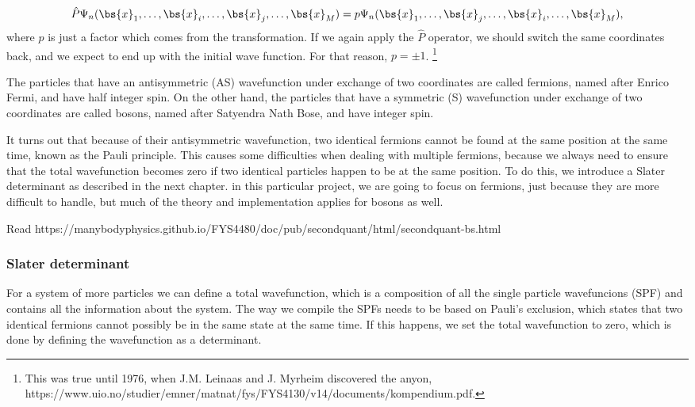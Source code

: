 \begin{equation}
\hat{P}\Psi_n(\bs{x}_1,\hdots,\bs{x}_i,\hdots,\bs{x}_j,\hdots,\bs{x}_M)=p\Psi_n(\bs{x}_1,\hdots,\bs{x}_j,\hdots,\bs{x}_i,\hdots,\bs{x}_M),
\end{equation}
where $p$ is just a factor which comes from the transformation. If we again apply the $\hat{P}$ operator, we should switch the same coordinates back, and we expect to end up with the initial wave function. For that reason, $p=\pm1$. \footnote{This was true until 1976, when J.M. Leinaas and J. Myrheim discovered the anyon, https://www.uio.no/studier/emner/matnat/fys/FYS4130/v14/documents/kompendium.pdf.}

The particles that have an antisymmetric (AS) wavefunction under exchange of two coordinates are called fermions, named after Enrico Fermi, and have half integer spin. On the other hand, the particles that have a symmetric (S) wavefunction under exchange of two coordinates are called bosons, named after Satyendra Nath Bose, and have integer spin. 

It turns out that because of their antisymmetric wavefunction, two identical fermions cannot be found at the same position at the same time, known as the Pauli principle. This causes some difficulties when dealing with multiple fermions, because we always need to ensure that the total wavefunction becomes zero if two identical particles happen to be at the same position. To do this, we introduce a Slater determinant as described in the next chapter. in this particular project, we are going to focus on fermions, just because they are more difficult to handle, but much of the theory and implementation applies for bosons as well. 

Read https://manybodyphysics.github.io/FYS4480/doc/pub/secondquant/html/secondquant-bs.html


\subsubsection{Slater determinant} \label{subsubsec:slater}
For a system of more particles we can define a total wavefunction, which is a composition of all the single particle wavefuncions (SPF) and contains all the information about the system. The way we compile the SPFs needs to be based on Pauli's exclusion, which states that two identical fermions cannot possibly be in the same state at the same time. If this happens, we set the total wavefunction to zero, which is done by defining the wavefunction as a determinant. 

